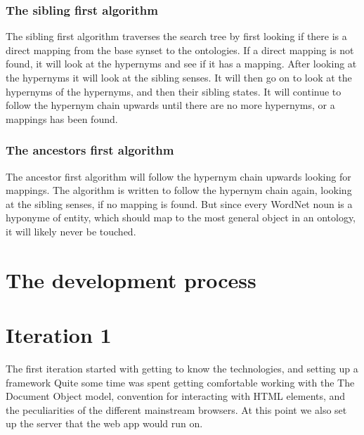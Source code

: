 \subsubsection{The sibling first algorithm}
The sibling first algorithm traverses the search tree by first looking if there is a direct mapping from the base synset to the ontologies.
If a direct mapping is not found, it will look at the hypernyms and see if it has a mapping.
After looking at the hypernyms it will look at the sibling senses.
It will then go on to look at the hypernyms of the hypernyms, and then their sibling states.
It will continue to follow the hypernym chain upwards until there are no more hypernyms, or a mappings has been found.

\subsubsection{The ancestors first algorithm}
The ancestor first algorithm will follow the hypernym chain upwards looking for mappings.
The algorithm is written to follow the hypernym chain again, looking at the sibling senses, if no mapping is found.
But since every WordNet noun is a hyponyme of {entity}, which should map to the most general object in an ontology,
it will likely never be touched.



\section{The development process}


\section{Iteration 1}
The first iteration started with getting to know the technologies, and setting up a framework
Quite some time was spent getting comfortable working with the 
{The Document Object model, convention for interacting with HTML elements},
and the peculiarities of the different mainstream browsers.
At this point we also set up the server that the web app would run on.

